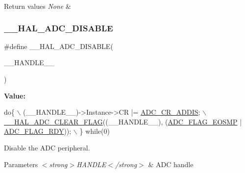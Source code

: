 \begin{DoxyRetVals}{Return values}
{\em None} & \\
\hline
\end{DoxyRetVals}
\mbox{\label{group___a_d_c___exported___macros_ga8afd5963c41c0a30c5cf1fec5c5710b3}} 
\subsubsection{\texorpdfstring{\+\_\+\+\_\+\+H\+A\+L\+\_\+\+A\+D\+C\+\_\+\+D\+I\+S\+A\+B\+LE}{\_\_HAL\_ADC\_DISABLE}}
{\footnotesize\ttfamily \#define \+\_\+\+\_\+\+H\+A\+L\+\_\+\+A\+D\+C\+\_\+\+D\+I\+S\+A\+B\+LE(\begin{DoxyParamCaption}\item[{}]{\+\_\+\+\_\+\+H\+A\+N\+D\+L\+E\+\_\+\+\_\+ }\end{DoxyParamCaption})}

{\bfseries Value\+:}
\begin{DoxyCode}
\textcolor{keywordflow}{do}\{                                                                          \(\backslash\)
      (\_\_HANDLE\_\_)->Instance->CR |= \hyperlink{group___peripheral___registers___bits___definition_gad99494f414a25f32a5f00ea39ea2150a}{ADC\_CR\_ADDIS};                              \(\backslash\)
      \hyperlink{group___a_d_c___exported___macros_gafe44e1e66141bca3665bb82981a81a17}{\_\_HAL\_ADC\_CLEAR\_FLAG}((\_\_HANDLE\_\_), (\hyperlink{group___a_d_c__flags__definition_gacf79acb4682b5c104fe38f9dff035656}{ADC\_FLAG\_EOSMP} | 
      \hyperlink{group___a_d_c__flags__definition_gaf1a4a140115121cc0ec1f821d2c8c199}{ADC\_FLAG\_RDY}));     \(\backslash\)
  \} \textcolor{keywordflow}{while}(0)
\end{DoxyCode}


Disable the A\+DC peripheral. 


\begin{DoxyParams}{Parameters}
{\em $<$strong$>$\+H\+A\+N\+D\+L\+E$<$/strong$>$} & A\+DC handle \\
\hline
\end{DoxyParams}

